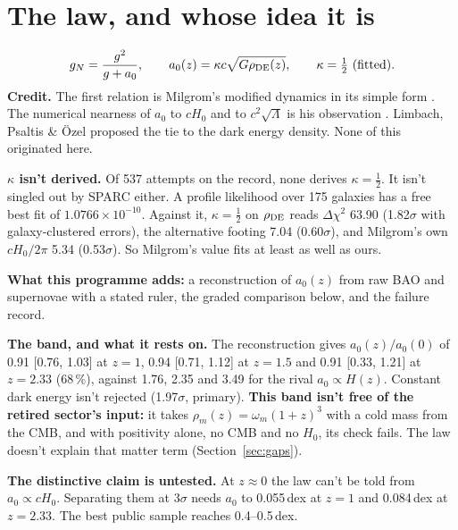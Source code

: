 \documentclass[10pt]{article}
\begin{document}
\section{The law, and whose idea it is}
\[
g_N=\frac{g^2}{g+a_0},\qquad a_0(z)=\kappa c\sqrt{G\rho_{\rm DE}(z)},\qquad \kappa=\tfrac12\ \text{(fitted)}.
\]
\textbf{Credit.} The first relation is Milgrom's modified dynamics in its simple form \cite{M83}. The numerical nearness of $a_0$ to $cH_0$ and to $c^2\sqrt{\Lambda}$ is his observation \cite{M83,M99}. Limbach, Psaltis \& \"Ozel \cite{LPO} proposed the tie to the dark energy density. None of this originated here.

\textbf{$\kappa$ isn't derived.} Of 537 attempts on the record, none derives $\kappa=\tfrac12$. It isn't singled out by SPARC either. A profile likelihood over 175 galaxies has a free best fit of $1.0766\times10^{-10}$. Against it, $\kappa=\tfrac12$ on $\rho_{\rm DE}$ reads $\Delta\chi^2$ 63.90 (1.82$\sigma$ with galaxy-clustered errors), the alternative footing 7.04 (0.60$\sigma$), and Milgrom's own $cH_0/2\pi$ 5.34 (0.53$\sigma$). So Milgrom's value fits at least as well as ours.

\textbf{What this programme adds:} a reconstruction of $a_0(z)$ from raw BAO and supernovae with a stated ruler, the graded comparison below, and the failure record.

\textbf{The band, and what it rests on.} The reconstruction gives $a_0(z)/a_0(0)$ of 0.91 [0.76, 1.03] at $z=1$, 0.94 [0.71, 1.12] at $z=1.5$ and 0.91 [0.33, 1.21] at $z=2.33$ (68\,\%), against 1.76, 2.35 and 3.49 for the rival $a_0\propto H(z)$. Constant dark energy isn't rejected (1.97$\sigma$, primary). \textbf{This band isn't free of the retired sector's input:} it takes $\rho_m(z)=\omega_m(1+z)^3$ with a cold mass from the CMB, and with positivity alone, no CMB and no $H_0$, its check fails. The law doesn't explain that matter term (Section~\ref{sec:gaps}).

\textbf{The distinctive claim is untested.} At $z\approx0$ the law can't be told from $a_0\propto cH_0$. Separating them at 3$\sigma$ needs $a_0$ to 0.055\,dex at $z=1$ and 0.084\,dex at $z=2.33$. The best public sample reaches 0.4--0.5\,dex.
\end{document}
